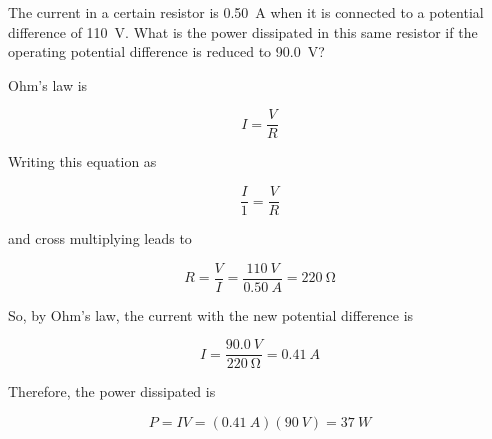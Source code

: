 \documentclass[]{exam}
\begin{document}
\begin{questions}
\begin{parts}
\end{parts}

\question
The current in a certain resistor is \SI{0.50}{A} when it is connected to a potential difference of \SI{110}{V}. What is the power dissipated in this same resistor if the operating potential difference is reduced to \SI{90.0}{V}?


\begin{solution}
Ohm's law is

\begin{equation*}
    I = \frac{V}{R}
\end{equation*}

Writing this equation as

\begin{equation*}
    \frac{I}{1} = \frac{V}{R}
\end{equation*}

and cross multiplying leads to

\begin{equation*}
    R = \frac{V}{I} = \frac{\SI{110}{V}}{\SI{0.50}{A}} = \SI{220}{\ohm}
\end{equation*}

So, by Ohm's law, the current with the new potential difference is

\begin{equation*}
    I = \frac{\SI{90.0}{V}}{\SI{220}{\ohm}} = \SI{0.41}{A}
\end{equation*}

Therefore, the power dissipated is

\begin{equation*}
    P = IV = (\SI{0.41}{A})(\SI{90}{V}) = \boxed{\SI{37}{W}}
\end{equation*}

\end{solution}





\end{questions}
\end{document}
